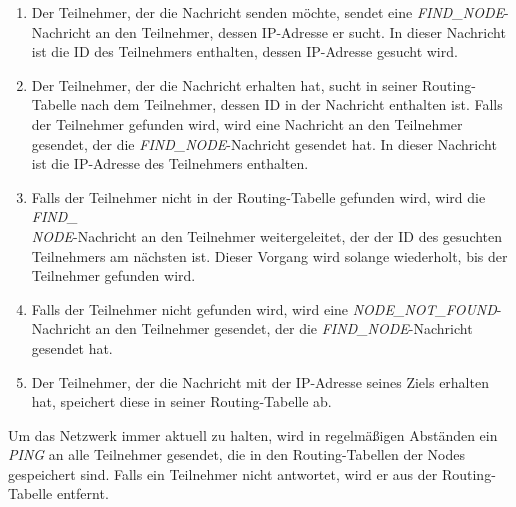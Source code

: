 \begin{enumerate}
    \item Der Teilnehmer, der die Nachricht senden möchte, sendet eine \textit{FIND\_NODE}-Nachricht an den Teilnehmer, dessen IP-Adresse er sucht. In dieser Nachricht ist die ID des Teilnehmers enthalten, dessen IP-Adresse gesucht wird.
    \item Der Teilnehmer, der die Nachricht erhalten hat, sucht in seiner Routing-Tabelle nach dem Teilnehmer, dessen ID in der Nachricht enthalten ist. Falls der Teilnehmer gefunden wird, wird eine Nachricht an den Teilnehmer gesendet, der die \textit{FIND\_NODE}-Nachricht gesendet hat. In dieser Nachricht ist die IP-Adresse des Teilnehmers enthalten.
    \item Falls der Teilnehmer nicht in der Routing-Tabelle gefunden wird, wird die \textit{FIND\_\\NODE}-Nachricht an den Teilnehmer weitergeleitet, der der ID des gesuchten Teilnehmers am nächsten ist. Dieser Vorgang wird solange wiederholt, bis der Teilnehmer gefunden wird.
    \item Falls der Teilnehmer nicht gefunden wird, wird eine \textit{NODE\_NOT\_FOUND}-\\Nachricht an den Teilnehmer gesendet, der die \textit{FIND\_NODE}-Nachricht gesendet hat.
    \item Der Teilnehmer, der die Nachricht mit der IP-Adresse seines Ziels erhalten hat, speichert diese in seiner Routing-Tabelle ab.
\end{enumerate}

\noindent Um das Netzwerk immer aktuell zu halten, wird in regelmäßigen Abständen ein \textit{PING} an alle Teilnehmer gesendet, die in den Routing-Tabellen der Nodes gespeichert sind. Falls ein Teilnehmer nicht antwortet, wird er aus der Routing-Tabelle entfernt.
